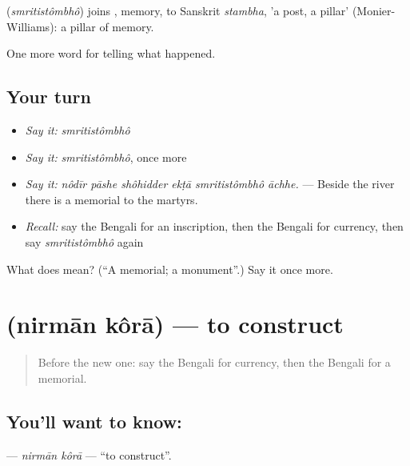 \begin{cousinweb}
\textbf{} (\emph{smritistômbhô}) joins \textbf{}, memory, to Sanskrit \emph{stambha}, 'a post, a pillar' (Monier-Williams): a pillar of memory.
\end{cousinweb}

\begin{grammarlens}[title={What you've built}]
One more word for telling what happened.
\end{grammarlens}

\subsection*{Your turn}
\begin{itemize}
\raggedright
  \item \emph{Say it:} \emph{smritistômbhô}
  \item \emph{Say it:} \emph{smritistômbhô}, once more
  \item \emph{Say it:} \emph{nôdīr pāshe shôhidder ekṭā smritistômbhô āchhe.} — Beside the river there is a memorial to the martyrs.
  \item \emph{Recall:} say the Bengali for an inscription, then the Bengali for currency, then say \emph{smritistômbhô} again
\end{itemize}

\begin{tcolorbox}[breakable,colback=teal!4,colframe=teal!35!black,title={Before you move on}]
What does  mean? (\textquotedblleft{}A memorial; a monument\textquotedblright{}.) Say it once more.
\end{tcolorbox}
\section[\texorpdfstring{\bn{নির্মাণ} \bn{করা} (nirmān kôrā)}{নির্মাণ করা (nirmān kôrā)}]{  (nirmān kôrā) — to construct}

\label{lesson:BN-C320-nirman-kora}



\begin{quote}
Before the new one: say the Bengali for currency, then the Bengali for a memorial.
\end{quote}

\subsection*{You'll want to know:  }
\textbf{ } — \emph{nirmān kôrā} — \textquotedblleft{}to construct\textquotedblright{}.

